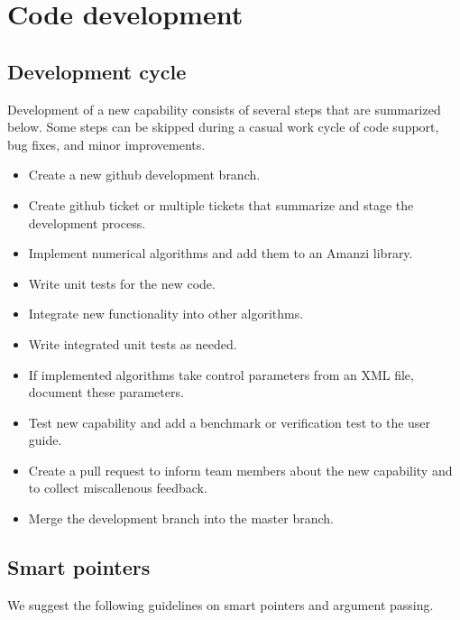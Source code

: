 \section{Code development}
\subsection{Development cycle}
Development of a new capability consists of several steps that are summarized below.
Some steps can be skipped during a casual work cycle of code support, bug fixes, and minor improvements. 

\begin{itemize}
\item Create a new github development branch.
\item Create github ticket or multiple tickets that summarize and stage the development process.
\item Implement numerical algorithms and add them to an Amanzi library.
\item Write unit tests for the new code.
\item Integrate new functionality into other algorithms.
\item Write integrated unit tests as needed.
\item If implemented algorithms take control parameters from an XML file, 
      document these parameters.
\item Test new capability and add a benchmark or verification test to the
      user guide.
\item Create a pull request to inform team members about the new capability and 
      to collect miscallenous feedback.
\item Merge the development branch into the master branch.
\end{itemize}


\subsection{Smart pointers}
We suggest the following guidelines on smart pointers and argument passing.

